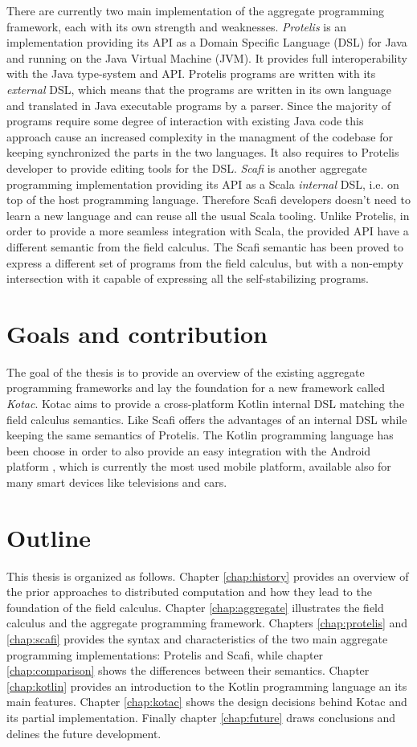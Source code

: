 There are currently two main implementation of the aggregate programming framework, each with its own strength and weaknesses. \textit{Protelis} \cite{Protelis} is an implementation providing its API as a Domain Specific Language (DSL) for Java and running on the Java Virtual Machine (JVM). It provides full interoperability with the Java type-system and API. Protelis programs are written with its \textit{external} DSL, which means that the programs are written in its own language and translated in Java executable programs by a parser. Since the majority of programs require some degree of interaction with existing Java code this approach cause an increased complexity in the managment of the codebase for keeping synchronized the parts in the two languages. It also requires to Protelis developer to provide editing tools for the DSL. \textit{Scafi} \cite{Scafi} is another aggregate programming implementation providing its API as a Scala \cite{Scala} \textit{internal} DSL, i.e. on top of the host programming language. Therefore Scafi developers doesn't need to learn a new language and can reuse all the usual Scala tooling. Unlike Protelis, in order to provide a more seamless integration with Scala, the provided API have a different semantic from the field calculus. The Scafi semantic has been proved to express a different set of programs from the field calculus, but with a non-empty intersection with it capable of expressing all the self-stabilizing programs.

\section{Goals and contribution}
The goal of the thesis is to provide an overview of the  existing aggregate programming frameworks and lay the foundation for a new framework called \textit{Kotac}. Kotac aims to provide a cross-platform Kotlin \cite{Kotlin} internal DSL matching the field calculus semantics. Like Scafi offers the advantages of an internal DSL while keeping the same semantics of Protelis. The Kotlin programming language has been choose in order to also provide an easy integration with the Android platform \cite{Android}, which is currently the most used mobile platform, available also for many smart devices like televisions and cars.

\section{Outline}
This thesis is organized as follows. Chapter \ref{chap:history} provides an overview of the prior approaches to distributed computation and how they lead to the foundation of the field calculus. Chapter \ref{chap:aggregate} illustrates the field calculus and the aggregate programming framework. Chapters \ref{chap:protelis} and \ref{chap:scafi} provides the syntax and characteristics of the two main aggregate programming implementations: Protelis and Scafi, while chapter \ref{chap:comparison} shows the differences between their semantics. Chapter \ref{chap:kotlin} provides an introduction to the Kotlin programming language an its main features. Chapter \ref{chap:kotac} shows the design decisions behind Kotac and its partial implementation. Finally chapter \ref{chap:future} draws conclusions and delines the future development.
